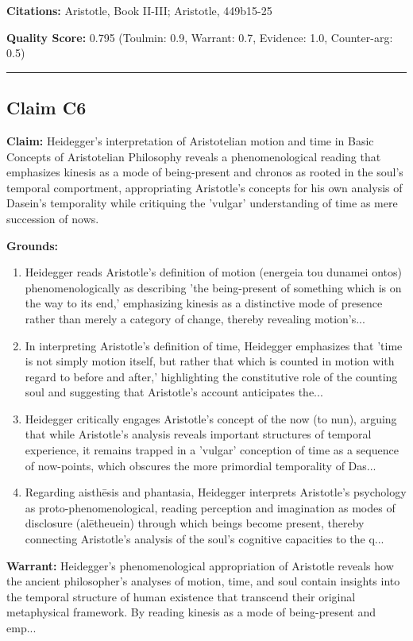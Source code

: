 \documentclass[12pt,a4paper]{article}
\begin{document}
\textbf{Citations:} Aristotle, Book II-III; Aristotle, 449b15-25

\textbf{Quality Score:} 0.795 (Toulmin: 0.9, Warrant: 0.7, Evidence: 1.0, Counter-arg: 0.5)

\medskip\hrule\medskip

\subsection*{Claim C6}

\textbf{Claim:} Heidegger's interpretation of Aristotelian motion and time in Basic Concepts of Aristotelian Philosophy reveals a phenomenological reading that emphasizes kinesis as a mode of being-present and chronos as rooted in the soul's temporal comportment, appropriating Aristotle's concepts for his own analysis of Dasein's temporality while critiquing the 'vulgar' understanding of time as mere succession of nows.

\textbf{Grounds:}
\begin{enumerate}[nosep]
\item Heidegger reads Aristotle's definition of motion (energeia tou dunamei ontos) phenomenologically as describing 'the being-present of something which is on the way to its end,' emphasizing kinesis as a distinctive mode of presence rather than merely a category of change, thereby revealing motion's...
\item In interpreting Aristotle's definition of time, Heidegger emphasizes that 'time is not simply motion itself, but rather that which is counted in motion with regard to before and after,' highlighting the constitutive role of the counting soul and suggesting that Aristotle's account anticipates the...
\item Heidegger critically engages Aristotle's concept of the now (to nun), arguing that while Aristotle's analysis reveals important structures of temporal experience, it remains trapped in a 'vulgar' conception of time as a sequence of now-points, which obscures the more primordial temporality of Das...
\item Regarding aisthēsis and phantasia, Heidegger interprets Aristotle's psychology as proto-phenomenological, reading perception and imagination as modes of disclosure (alētheuein) through which beings become present, thereby connecting Aristotle's analysis of the soul's cognitive capacities to the q...
\end{enumerate}

\textbf{Warrant:} Heidegger's phenomenological appropriation of Aristotle reveals how the ancient philosopher's analyses of motion, time, and soul contain insights into the temporal structure of human existence that transcend their original metaphysical framework. By reading kinesis as a mode of being-present and emp...
\end{document}
